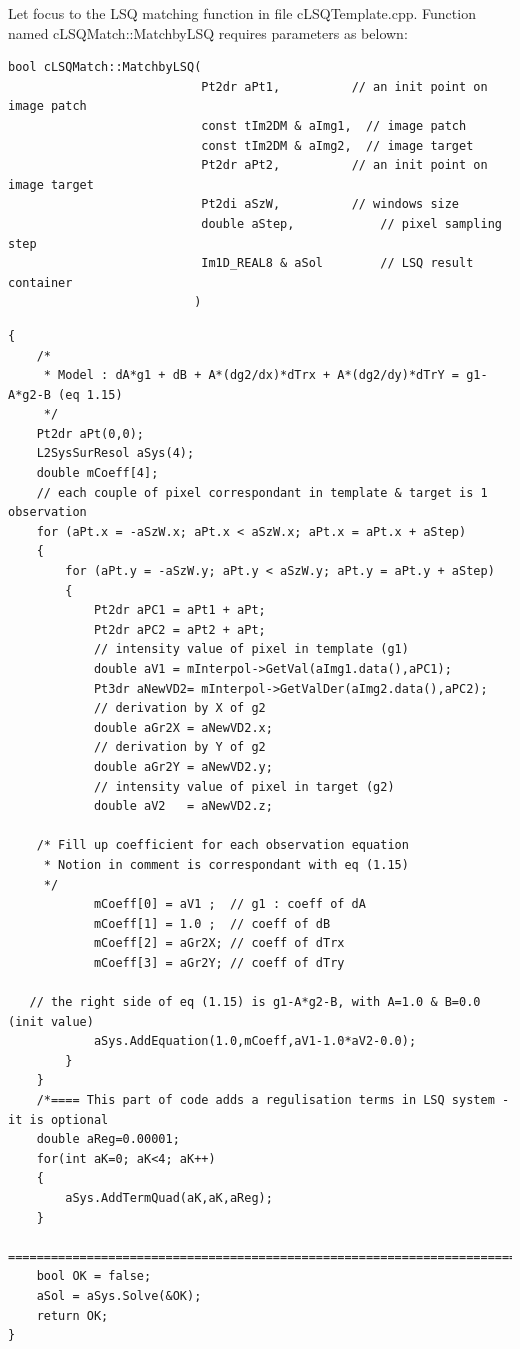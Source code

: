 \documentclass[twoside]{article}
\begin{document}
Let focus to the LSQ matching function in file {\color{blue}cLSQTemplate.cpp}. Function named {\color{orange}cLSQMatch::MatchbyLSQ} requires parameters as belown:
\begin{lstlisting}
bool cLSQMatch::MatchbyLSQ(
                           Pt2dr aPt1,			// an init point on image patch
                           const tIm2DM & aImg1,  // image patch                               
                           const tIm2DM & aImg2,  // image target
                           Pt2dr aPt2,			// an init point on image target
                           Pt2di aSzW,			// windows size
                           double aStep,			// pixel sampling step
                           Im1D_REAL8 & aSol		// LSQ result container
                          )
\end{lstlisting}

\begin{lstlisting}
{
    /*
     * Model : dA*g1 + dB + A*(dg2/dx)*dTrx + A*(dg2/dy)*dTrY = g1-A*g2-B (eq 1.15)
     */
    Pt2dr aPt(0,0);
    L2SysSurResol aSys(4);
    double mCoeff[4];
    // each couple of pixel correspondant in template & target is 1 observation
    for (aPt.x = -aSzW.x; aPt.x < aSzW.x; aPt.x = aPt.x + aStep)
    {
        for (aPt.y = -aSzW.y; aPt.y < aSzW.y; aPt.y = aPt.y + aStep)
        {
            Pt2dr aPC1 = aPt1 + aPt;
            Pt2dr aPC2 = aPt2 + aPt;
            // intensity value of pixel in template (g1)
            double aV1 = mInterpol->GetVal(aImg1.data(),aPC1);    
            Pt3dr aNewVD2= mInterpol->GetValDer(aImg2.data(),aPC2);   
            // derivation by X of g2
            double aGr2X = aNewVD2.x;  
		    // derivation by Y of g2
            double aGr2Y = aNewVD2.y;  
            // intensity value of pixel in target (g2)
            double aV2   = aNewVD2.z; 

	/* Fill up coefficient for each observation equation
	 * Notion in comment is correspondant with eq (1.15)    
	 */
            mCoeff[0] = aV1 ;  // g1 : coeff of dA
            mCoeff[1] = 1.0 ;  // coeff of dB
            mCoeff[2] = aGr2X; // coeff of dTrx
            mCoeff[3] = aGr2Y; // coeff of dTry
			
   // the right side of eq (1.15) is g1-A*g2-B, with A=1.0 & B=0.0 (init value)
            aSys.AddEquation(1.0,mCoeff,aV1-1.0*aV2-0.0); 
        }
    }
    /*==== This part of code adds a regulisation terms in LSQ system - it is optional
    double aReg=0.00001;
    for(int aK=0; aK<4; aK++)
    {
        aSys.AddTermQuad(aK,aK,aReg);
    }
    =================================================================================*/
    bool OK = false;
    aSol = aSys.Solve(&OK);
    return OK;
}
\end{lstlisting}
\end{document}
